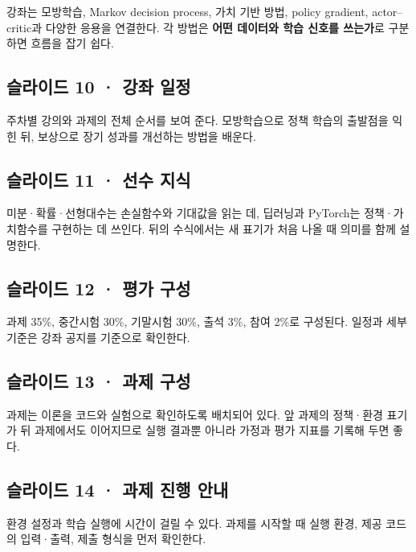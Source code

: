 \documentclass[11pt,a4paper]{article}
\begin{document}
강좌는 모방학습, Markov decision process, 가치 기반 방법, policy gradient, actor–critic과 다양한 응용을 연결한다. 각 방법은 \textbf{어떤 데이터와 학습 신호를 쓰는가}로 구분하면 흐름을 잡기 쉽다.\par

\subsection{슬라이드 10 · 강좌 일정}

주차별 강의와 과제의 전체 순서를 보여 준다. 모방학습으로 정책 학습의 출발점을 익힌 뒤, 보상으로 장기 성과를 개선하는 방법을 배운다.\par

\subsection{슬라이드 11 · 선수 지식}

미분·확률·선형대수는 손실함수와 기대값을 읽는 데, 딥러닝과 PyTorch는 정책·가치함수를 구현하는 데 쓰인다. 뒤의 수식에서는 새 표기가 처음 나올 때 의미를 함께 설명한다.\par

\subsection{슬라이드 12 · 평가 구성}

과제 35\%, 중간시험 30\%, 기말시험 30\%, 출석 3\%, 참여 2\%로 구성된다. 일정과 세부 기준은 강좌 공지를 기준으로 확인한다.\par

\subsection{슬라이드 13 · 과제 구성}

과제는 이론을 코드와 실험으로 확인하도록 배치되어 있다. 앞 과제의 정책·환경 표기가 뒤 과제에서도 이어지므로 실행 결과뿐 아니라 가정과 평가 지표를 기록해 두면 좋다.\par

\subsection{슬라이드 14 · 과제 진행 안내}

환경 설정과 학습 실행에 시간이 걸릴 수 있다. 과제를 시작할 때 실행 환경, 제공 코드의 입력·출력, 제출 형식을 먼저 확인한다.\par
\end{document}
